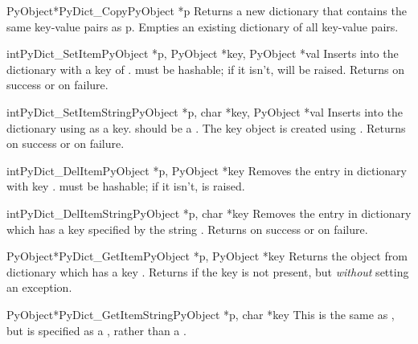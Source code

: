 \documentclass{manual}
\begin{document}
\begin{cfuncdesc}{PyObject*}{PyDict_Copy}{PyObject *p}
Returns a new dictionary that contains the same key-value pairs as p.
Empties an existing dictionary of all key-value pairs.
\end{cfuncdesc}

\begin{cfuncdesc}{int}{PyDict_SetItem}{PyObject *p, PyObject *key,
                                       PyObject *val}
Inserts  into the dictionary  with a key of .
 must be hashable; if it isn't,  will be 
raised.
Returns  on success or  on failure.
\end{cfuncdesc}

\begin{cfuncdesc}{int}{PyDict_SetItemString}{PyObject *p,
            char *key,
            PyObject *val}
Inserts  into the dictionary  using 
as a key.  should be a .  The key object is
created using .
Returns  on success or  on failure.
\end{cfuncdesc}

\begin{cfuncdesc}{int}{PyDict_DelItem}{PyObject *p, PyObject *key}
Removes the entry in dictionary  with key .
 must be hashable; if it isn't,  is
raised.
\end{cfuncdesc}

\begin{cfuncdesc}{int}{PyDict_DelItemString}{PyObject *p, char *key}
Removes the entry in dictionary  which has a key
specified by the string .
Returns  on success or  on failure.
\end{cfuncdesc}

\begin{cfuncdesc}{PyObject*}{PyDict_GetItem}{PyObject *p, PyObject *key}
Returns the object from dictionary  which has a key
.  Returns \NULL{} if the key  is not present, but
\emph{without} setting an exception.
\end{cfuncdesc}

\begin{cfuncdesc}{PyObject*}{PyDict_GetItemString}{PyObject *p, char *key}
This is the same as , but  is
specified as a , rather than a .
\end{cfuncdesc}
\end{document}
